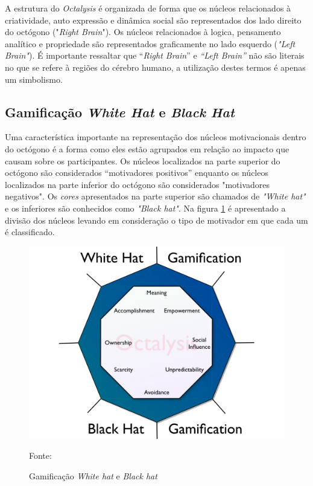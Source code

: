 A estrutura do \textit{Octalysis} é organizada de forma que os núcleos relacionados à criatividade, auto expressão e dinâmica social são
representados dos lado direito do octógono ("\textit{Right Brain}"). Os núcleos relacionados à logica, pensamento analítico e propriedade são representados graficamente
no lado esquerdo (\textit{"Left Brain"}). É importante ressaltar que ``\textit{Right Brain}'' e \textit{``Left Brain''} não são literais no que se refere
à regiões do cérebro humano, a utilização destes termos é apenas um simbolismo.

\subsection{Gamificação \textit{White Hat} e \textit{Black Hat}}

Uma característica importante na representação dos núcleos motivacionais dentro do octógono é a forma como eles estão agrupados em relação ao impacto
que causam sobre os participantes. Os núcleos localizados na parte superior do octógono são considerados ``motivadores positivos'' enquanto os núcleos localizados
na parte inferior do octógono são considerados "motivadores negativos". Os \textit{cores} apresentados na parte superior são chamados de \textit{"White hat"} e os inferiores
são conhecidos como \textit{"Black hat"}. Na figura \ref{octogono} é apresentado a divisão dos núcleos levando em consideração o tipo de motivador em que cada um
é classificado.

\begin{figure}[h]
	\centering
	\includegraphics[keepaspectratio=true,scale=0.28]{figuras/octogono.jpg}
	\caption{Gamificação \textit{White hat} e \textit{Black hat}}
	Fonte: \cite{chou2017actionable}
	\label{octogono}
\end{figure}

